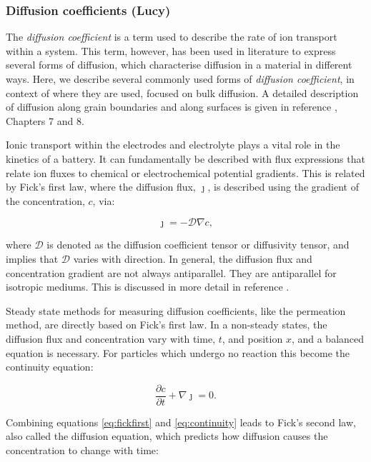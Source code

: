 \documentclass[../main.tex]{subfiles}
\begin{document}
\subsubsection{Diffusion coefficients (Lucy)}
\label{sec:diffusion}

The \textit{diffusion coefficient} is a term used to describe the rate of ion transport within a system. This term, however, has been used in literature to express several forms of diffusion, which characterise diffusion in a material in different ways. Here, we describe several commonly used forms of \textit{diffusion coefficient}, in context of where they are used, focused on bulk diffusion. A detailed description of diffusion along grain boundaries and along surfaces is given in reference , Chapters 7 and 8.

Ionic transport within the electrodes and electrolyte plays a vital role in the kinetics of a battery. It can fundamentally be described with flux expressions that relate ion fluxes to chemical or electrochemical potential gradients. This is related by Fick's first law, where the diffusion flux, $\boldsymbol{\jmath}$, is described using the gradient of the concentration, $c$, via:

\begin{equation}
    \boldsymbol{\jmath} = - \mathcal{D} \nabla c,
    \label{eq:fickfirst}
\end{equation}

where $\mathcal{D}$ is denoted as the diffusion coefficient tensor or diffusivity tensor, and implies that $\mathcal{D}$ varies with direction. In general, the diffusion flux and concentration gradient are not always antiparallel. They are antiparallel for isotropic mediums. This is discussed in more detail in reference .

Steady state methods for measuring diffusion coefficients, like the permeation method, \cite{heumann2013diffusion} are directly based on Fick's first law. In a non-steady states, the diffusion flux and concentration vary with time, $t$, and position $x$, and a balanced equation is necessary. For particles which undergo no reaction this become the continuity equation:

\begin{equation}
    \frac{\partial c}{\partial t} + \nabla {\boldsymbol{\jmath}} = 0.
    \label{eq:continuity}
\end{equation}

Combining equations \ref{eq:fickfirst} and \ref{eq:continuity} leads to Fick's second law, also called the diffusion equation, which predicts how diffusion causes the concentration to change with time:
\end{document}
